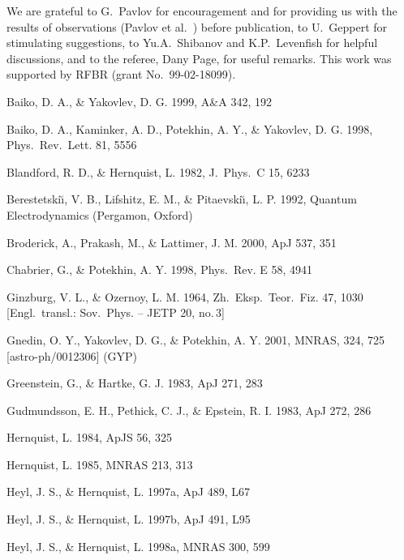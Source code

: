 \documentclass{aa}
\begin{document}
\begin{acknowledgements}
%
We are grateful to G.\ Pavlov for encouragement and for
providing us with the
results of observations (Pavlov et al.\ \cite{Vela-GG})
before publication, to U.\ Geppert 
for stimulating suggestions, 
to Yu.A.\ Shibanov and K.P.\ Levenfish for
helpful discussions, and to the referee, Dany Page,
for useful remarks.
This work was supported by RFBR (grant No.\ 99-02-18099).
\end{acknowledgements}


\begin{thebibliography}{} 

Baiko, D. A., \&  Yakovlev, D. G. 1999,
A\&A 342, 192

Baiko, D. A., Kaminker, A. D., Potekhin, A. Y., \& Yakovlev, D. G. 1998,
Phys.\ Rev.\ Lett. 81, 5556
 
Blandford, R. D., \& Hernquist, L. 1982,
J.\ Phys.\ C 15, 6233

Berestetski{\u\i}, V. B., Lifshitz, E. M., \& Pitaevski{\u\i}, L. P. 1992,
Quantum Electrodynamics (Pergamon, Oxford)

Broderick, A., Prakash, M., \& Lattimer, J. M. 2000,
ApJ 537, 351

Chabrier, G., \& Potekhin, A. Y. 1998,
Phys.\ Rev. E 58, 4941

Ginzburg, V. L., \& Ozernoy, L. M. 1964,
Zh.\ Eksp.\ Teor.\ Fiz. 47, 1030
[Engl.\ transl.: Sov.\ Phys. -- JETP 20, no.\,3]

Gnedin, O. Y., Yakovlev, D. G., \& Potekhin, A. Y. 2001,
MNRAS, 324, 725 [astro-ph/0012306] (GYP)
 
Greenstein, G., \& Hartke, G. J. 1983,
ApJ 271, 283

Gudmundsson, E. H., Pethick, C. J., \& Epstein, R. I. 1983, ApJ 272, 286 

Hernquist, L. 1984, ApJS 56, 325

Hernquist, L. 1985, MNRAS 213, 313

Heyl, J. S., \& Hernquist, L. 1997a, ApJ 489, L67

Heyl, J. S., \& Hernquist, L. 1997b, ApJ 491, L95

Heyl, J. S., \& Hernquist, L. 1998a, MNRAS 300, 599


\end{thebibliography}
\end{document}
